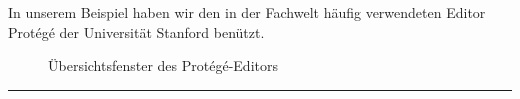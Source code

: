 In unserem Beispiel haben wir den in der Fachwelt häufig verwendeten Editor Protégé der Universität Stanford benützt.

\begin{figure}[H]
\centering {}
\caption{Übersichtsfenster des Protégé-Editors\label{fig:protege}\protect\footnotemark}
\end{figure}
\noindent\rule[1ex]{\textwidth}{1pt}

